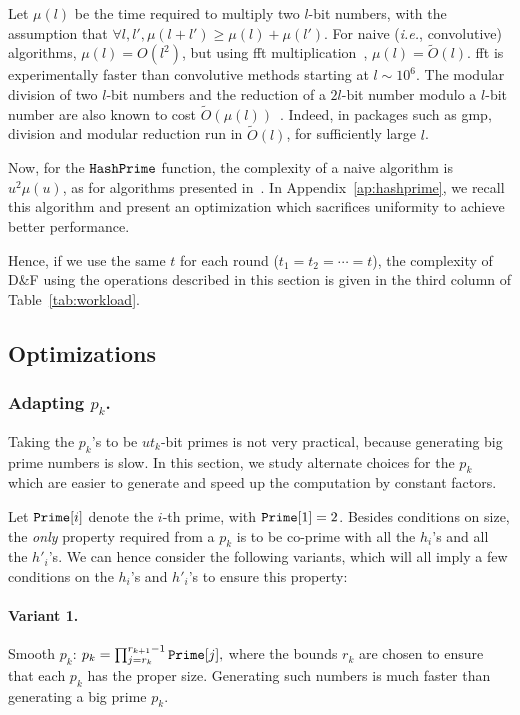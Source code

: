 \documentclass[twoside,envcountsame,runningheads]{llncs}
\newcommand{\Oapp}{\ensuremath{\tilde{O}}}
\newcommand{\df}{D\&F\xspace}
\newcommand{\ie}{\textit{i.e.}\xspace}
\newcommand{\apref}[1]{Appendix~\ref{#1}}
\newcommand{\apref}[1]{the full version~TODO}
\begin{document}
Let $\mu(l)$ be the time required to multiply two $l$-bit numbers, with the assumption that $\forall l,l', \mu(l+l') \ge \mu(l) + \mu(l')$.
For naive (\ie, convolutive) algorithms, $\mu(l) = O(l^2)$, but using {\sc fft} multiplication~\cite{schonhage1971schnelle}, $\mu(l) = \Oapp(l)$. {\sc fft} is experimentally faster than convolutive methods starting at $l \sim 10^6$.
The modular division of two $l$-bit numbers and the reduction of a $2l$-bit number modulo a $l$-bit number are also known to cost $\Oapp(\mu(l))$~\cite{burnikel1998fast}.
Indeed, in packages such as {\sf gmp}, division and modular reduction run in $\Oapp(l)$, for sufficiently large $l$.

Now, for the $\tt HashPrime$ function, the complexity of a naive algorithm is $u^2 \mu(u)$, as for algorithms presented in~\cite{C:HohWat09,PKC:AbdBenPoi13}.
In \apref{ap:hashprime}, we recall this algorithm and present an optimization which sacrifices uniformity to achieve better performance.

Hence, if we use the same $t$ for each round ($t_1=t_2=\cdots=t$), the complexity of \df using the operations described in this section is given in the third column of Table~\ref{tab:workload}.

\subsection{Optimizations}

\subsubsection{Adapting $p_k$.}
\label{sec:choicep}

Taking the $p_k$'s to be $ut_k$-bit primes is not very practical, because generating big prime numbers is slow. In this section, we study alternate choices for the $p_k$ which are easier to generate and speed up the computation by constant factors.

Let $\mbox{{\tt Prime}}[i]$ denote the $i$-th prime, with $\mbox{{\tt Prime}}[1]=2$. Besides conditions on size, the \textit{only} property required from a $p_k$ is to be co-prime with all the $h_i$'s and all the $h'_i$'s. We can hence consider the following variants, which will all imply a few conditions on the $h_i$'s and $h'_i$'s to ensure this property:
\paragraph{Variant 1.} Smooth $p_k$:
$ p_k=\prod_{j=r_k}^{r_{k+1}-1} \mbox{{\tt Prime}}[j], $
where the bounds $r_k$ are chosen to ensure that each $p_k$ has the proper size.
Generating such numbers is much faster than generating a big prime $p_k$.
\end{document}
